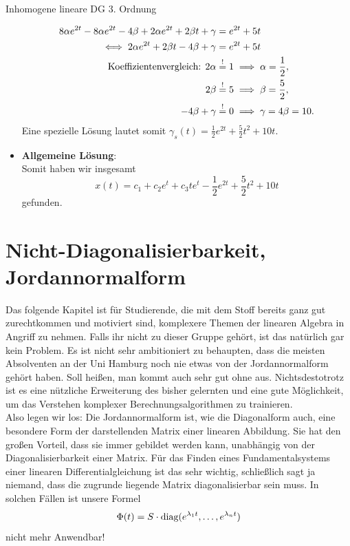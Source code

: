 \begin{Beispiel}{Inhomogene lineare DG 3. Ordnung}
\begin{itemize}
    \begin{align*}
        8\alpha e^{2t}-8\alpha e^{2t}-4\beta+2\alpha e^{2t}+2\beta t+\gamma&=e^{2t}+5t\\
        \iff 2\alpha e^{2t}+2\beta t- 4\beta +\gamma &=e^{2t}+5t\\
        \text{Koeffizientenvergleich: }2\alpha&\overset{!}{=}1\implies \alpha=\frac{1}{2},\\
        2\beta&\overset{!}{=}5\implies\beta=\frac{5}{2},\\
        -4\beta+\gamma&\overset{!}{=}0\implies \gamma=4\beta=10.
    \end{align*}
    Eine spezielle Lösung lautet somit $\gamma_s(t)=\frac{1}{2}e^{2t}+\frac{5}{2}t^2+10t$.
    \item \textbf{Allgemeine Lösung}:\\
    Somit haben wir insgesamt
    \begin{equation*}
        x(t)=c_1+c_2e^t+c_3te^t-\frac{1}{2}e^{2t}+\frac{5}{2}t^2+10t
    \end{equation*}
    gefunden.
\end{itemize}
\end{Beispiel}

\newpage

\section{Nicht-Diagonalisierbarkeit, Jordannormalform}
Das folgende Kapitel ist für Studierende, die mit dem Stoff bereits ganz gut zurechtkommen und motiviert sind, komplexere Themen der linearen Algebra in Angriff zu nehmen. Falls ihr nicht zu dieser Gruppe gehört, ist das natürlich gar kein Problem. Es ist nicht sehr ambitioniert zu behaupten, dass die meisten Absolventen an der Uni Hamburg noch nie etwas von der Jordannormalform gehört haben. Soll heißen, man kommt auch sehr gut ohne aus. Nichtsdestotrotz ist es eine nützliche Erweiterung des bisher gelernten und eine gute Möglichkeit, um das Verstehen komplexer Berechnungsalgorithmen zu trainieren. \\

Also legen wir los: Die Jordannormalform ist, wie die Diagonalform auch, eine besondere Form der darstellenden Matrix einer linearen Abbildung. Sie hat den großen Vorteil, dass sie immer gebildet werden kann, unabhängig von der Diagonalisierbarkeit einer Matrix. Für das Finden eines Fundamentalsystems einer linearen Differentialgleichung ist das sehr wichtig, schließlich sagt ja niemand, dass die zugrunde liegende Matrix diagonalisierbar sein muss. In solchen Fällen ist unsere Formel
\begin{equation*}
    \Phi(t)=S\cdot\text{diag}(e^{\lambda_1t},\ldots,e^{\lambda_n t})
\end{equation*}
nicht mehr Anwendbar! \\

